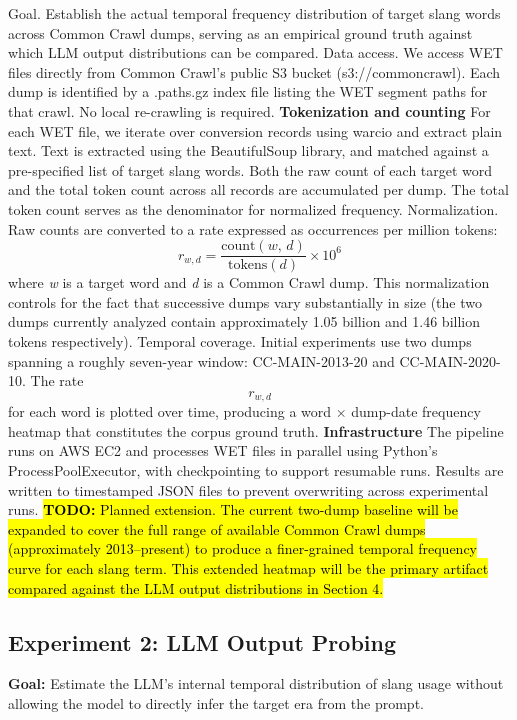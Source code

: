 \documentclass[11pt]{article}
\newcommand{\todo}[1]{\hl{\textbf{TODO:} #1}}
\begin{document}
Goal. Establish the actual temporal frequency distribution of target slang words across Common Crawl dumps, serving as an empirical ground truth against which LLM output distributions can be compared.
Data access. We access WET files directly from Common Crawl's public S3 bucket (s3://commoncrawl). Each dump is identified by a .paths.gz index file listing the WET segment paths for that crawl. No local re-crawling is required.
\textbf{Tokenization and counting} For each WET file, we iterate over conversion records using warcio and extract plain text. Text is extracted using the BeautifulSoup library, and matched against a pre-specified list of target slang words. Both the raw count of each target word and the total token count across all records are accumulated per dump. The total token count serves as the denominator for normalized frequency.
Normalization. Raw counts are converted to a rate expressed as occurrences per million tokens:
\[
r_{w,d} = \frac{\text{count}(w,\, d)}{\text{tokens}(d)} \times 10^{6}
\]
where \textit{w} is a target word and \textit{d} is a Common Crawl dump. This normalization controls for the fact that successive dumps vary substantially in size (the two dumps currently analyzed contain approximately 1.05 billion and 1.46 billion tokens respectively).
Temporal coverage. Initial experiments use two dumps spanning a roughly seven-year window: CC-MAIN-2013-20 and CC-MAIN-2020-10. The rate \[r_{w,d}\] for each word is plotted over time, producing a word $\times$ dump-date frequency heatmap that constitutes the corpus ground truth.
\textbf{Infrastructure} The pipeline runs on AWS EC2 and processes WET files in parallel using Python's ProcessPoolExecutor, with checkpointing to support resumable runs. Results are written to timestamped JSON files to prevent overwriting across experimental runs.
\todo{Planned extension. The current two-dump baseline will be expanded to cover the full range of available Common Crawl dumps (approximately 2013--present) to produce a finer-grained temporal frequency curve for each slang term. This extended heatmap will be the primary artifact compared against the LLM output distributions in Section 4.}

\subsection{Experiment 2: LLM Output Probing}
\label{sec:exp2-method}

\textbf{Goal:} Estimate the LLM's internal temporal distribution of slang usage without allowing the model to directly infer the target era from the prompt.
\end{document}
